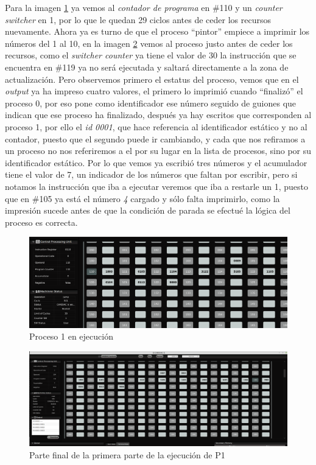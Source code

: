 \documentclass[letterpaper,12pt,oneside]{book}
\begin{document}
		Para la imagen \ref{fig:proceso1ExecP1} ya vemos al \textit{contador de programa} en \#110 y un \textit{counter switcher} en 1, por lo que le quedan 29 ciclos antes 
		de ceder los recursos nuevamente. Ahora ya es turno de que el proceso ``pintor'' empiece a imprimir los números del 1 al 10, en la imagen
		\ref{fig:proceso1Exec1P1Final} vemos al proceso justo antes de ceder los recursos, como el \textit{switcher counter} ya tiene el valor de 30 la instrucción que se encuentra
		en \#119 ya no será ejecutada y saltará directamente a la zona de actualización. Pero observemos primero el estatus del proceso, vemos que en
		el \textit{output} ya ha impreso cuatro valores, el primero lo imprimió cuando ``finalizó'' el proceso 0, por eso pone como identificador ese número
		seguido de guiones que indican que ese proceso ha finalizado, después ya hay escritos que corresponden al proceso 1, por ello el \textit{id 0001}, que hace
		referencia al identificador estático y no al contador, puesto que el segundo puede ir cambiando, y cada que nos refiramos a un proceso no nos referiremos
		a el por su lugar en la lista de procesos, sino por su identificador estático. Por lo que vemos ya escribió tres números y el acumulador
		tiene el valor de 7, un indicador de los números que faltan por escribir, pero si notamos la instrucción que iba a ejecutar veremos que iba a restarle un
		1, puesto que en \#105 ya está el número \textit{4} cargado y sólo falta imprimirlo, como la impresión sucede antes de que la condición de parada se efectué
		la lógica del proceso es correcta.


		\begin{figure}[h]		
			\centering
			\includegraphics[scale=0.33]{media/CARDIACC/proceso1Exec1P1.png}
			\caption{ Proceso 1 en ejecución}
			\label{fig:proceso1ExecP1}
		\end{figure}		
		
		
		\begin{figure}[h]		
			\centering
			\includegraphics[scale=0.29,angle=90]{media/CARDIACC/proceso1Exec1P1Final.png}
			\caption{ Parte final de la primera parte de la ejecución de P1}
			\label{fig:proceso1Exec1P1Final}
		\end{figure}
		
\end{document}
